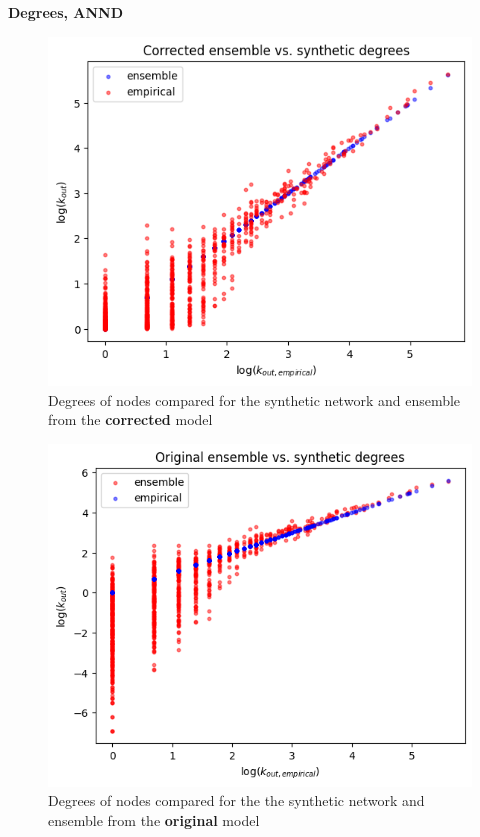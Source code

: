 \documentclass{article}
\begin{document}
\clearpage
\textbf{Degrees, ANND}
\begin{figure}[!ht]
    \centering
    \includegraphics[scale=0.4]{img/metropolis/corrected model/dg_vs_dg.png}
    \caption{Degrees of nodes compared for the synthetic network and ensemble from the \textbf{corrected} model}
\end{figure}\begin{figure}[!ht]
    \centering
    \includegraphics[scale=0.4]{img/metropolis/vanilla model/dg_vs_dg.png}
    \caption{Degrees of nodes compared for the the synthetic network and ensemble from the \textbf{original} model}
\end{figure}
\end{document}
